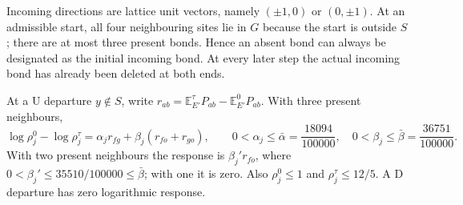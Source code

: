 Incoming directions are lattice unit vectors, namely
\((\pm1,0)\) or \((0,\pm1)\).
At an admissible start, all four neighbouring sites lie in \(G\)
because the start is outside \(S\); there are at most three
present bonds. Hence an absent bond can always be designated as
the initial incoming bond. At every later step the actual incoming
bond has already been deleted at both ends.

\begin{lemma}\label{l:response}
At a \(\mathrm U\) departure \(y\notin S\), write
\(r_{ab}=\mathbb E^\tau_{E'}P_{ab}-\mathbb E^0_{E'}P_{ab}\).
With three present neighbours,
\[
 \log\rho_j^0-\log\rho_j^\tau
       =\alpha_jr_{fg}+\beta_j(r_{fo}+r_{go}),\qquad
 0<\alpha_j\le\bar\alpha=\frac{18094}{100000},\quad
 0<\beta_j\le\bar\beta=\frac{36751}{100000}.
\]
With two present neighbours the response is \(\beta_j'r_{fo}\),
where \(0<\beta_j'\le35510/100000\le\bar\beta\);
with one it is zero. Also \(\rho_j^0\le1\) and
\(\rho_j^\tau\le12/5\).
A \(\mathrm D\) departure has zero logarithmic response.
\end{lemma}

